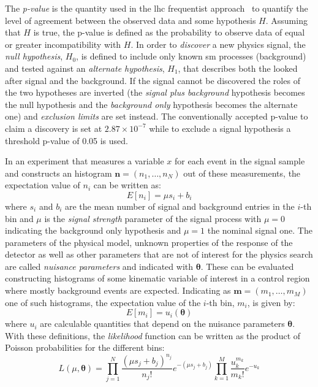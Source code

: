 The \emph{p-value} is the quantity used in the \gls{lhc} frequentist
approach~\cite{StatProcedure} to quantify the level of agreement between the
observed data and some hypothesis $H$. Assuming that $H$ is true, the p-value is
defined as the probability to observe data of equal or greater incompatibility
with $H$. In order to \emph{discover} a new physics signal, the \emph{null
  hypothesis}, $H_0$, is defined to include only known \gls{sm} processes
(background) and tested against an \emph{alternate hypothesis}, $H_1$, that
describes both the looked after signal and the background. If the signal cannot
be discovered the roles of the two hypotheses are inverted (the \emph{signal
  plus background} hypothesis becomes the null hypothesis and the
\emph{background only} hypothesis becomes the alternate one) and \emph{exclusion
  limits} are set instead. The conventionally accepted p-value to claim a
discovery is set at $2.87 \times 10^{-7}$ while to exclude a signal hypothesis a
threshold p-value of 0.05 is used.

In an experiment that measures a variable $x$ for each event in the signal
sample and constructs an histogram $\boldsymbol{n} = (n_1, \dots, n_N)$ out of
these measurements, the expectation value of $n_i$ can be written as:
\begin{equation}
  \label{eq:103}
  E[n_i] = \mu s_i + b_i
\end{equation}
where $s_i$ and $b_i$ are the mean number of signal and background entries in
the $i$-th bin and $\mu$ is the \emph{signal strength} parameter of the signal
process with $\mu = 0$ indicating the background only hypothesis and $\mu = 1$
the nominal signal one. The parameters of the physical model, unknown properties
of the response of the detector as well as other parameters that are not of
interest for the physics search are called \emph{nuisance parameters} and
indicated with $\boldsymbol{\theta}$. These can be evaluated constructing
histograms of some kinematic variable of interest in a control region where
mostly background events are expected. Indicating as
$\boldsymbol{m} = (m_1, \dots, m_M)$ one of such histograms, the expectation
value of the $i$-th bin, $m_i$, is given by:
\begin{equation}
  \label{eq:104}
  E[m_i] = u_i(\boldsymbol{\theta})
\end{equation}
where $u_i$ are calculable quantities that depend on the nuisance parameters
$\boldsymbol{\theta}$. With these definitions, the \emph{likelihood} function
can be written as the product of Poisson probabilities for the different bins:
\begin{equation}
  \label{eq:105}
  L(\mu, \boldsymbol{\theta}) = \prod_{j = 1}^N \frac{(\mu s_j +
    b_j)^{n_j}}{n_j!} e^{-(\mu s_j + b_j)} \prod_{k = 1}^M
  \frac{u_k^{m_k}}{m_k!} e^{-u_k}
\end{equation}

